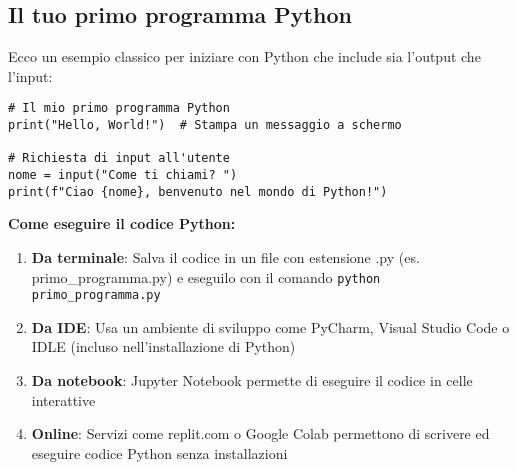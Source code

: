 \subsection{Il tuo primo programma Python}\label{primoProgramma}

Ecco un esempio classico per iniziare con Python che include sia l'output che l'input:

\begin{lstlisting}
# Il mio primo programma Python
print("Hello, World!")  # Stampa un messaggio a schermo

# Richiesta di input all'utente
nome = input("Come ti chiami? ")
print(f"Ciao {nome}, benvenuto nel mondo di Python!")
\end{lstlisting}

\begin{nota}
\textbf{Come eseguire il codice Python:}
\begin{enumerate}
    \item \textbf{Da terminale}: Salva il codice in un file con estensione .py (es. primo\_programma.py) e eseguilo con il comando \texttt{python primo\_programma.py}
    \item \textbf{Da IDE}: Usa un ambiente di sviluppo come PyCharm, Visual Studio Code o IDLE (incluso nell'installazione di Python)
    \item \textbf{Da notebook}: Jupyter Notebook permette di eseguire il codice in celle interattive
    \item \textbf{Online}: Servizi come replit.com o Google Colab permettono di scrivere ed eseguire codice Python senza installazioni
\end{enumerate}
\end{nota}
